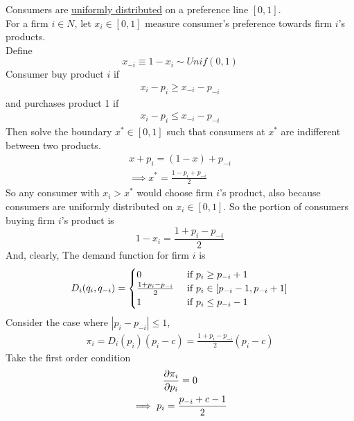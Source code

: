 \documentclass[11pt]{article}
\begin{document}
	\begin{example}
		Consumers are \ul{uniformly distributed} on a preference line $[0,1]$.\\
		For a firm $i \in N$, let $x_i \in [0,1]$ measure consumer's preference towards firm $i$'s products. \\
		Define 
		\begin{equation}
			x_{-i} \equiv 1 - x_i \sim Unif(0,1)
		\end{equation}
		Consumer buy product $i$ if 
		\begin{gather}
			x_i - p_i \geq x_{-i} - p_{-i}
		\end{gather}
		and purchases product 1 if
		\begin{gather}
			x_i - p_i \leq x_{-i} - p_{-i}
		\end{gather}
		Then solve the boundary $x^* \in [0, 1]$ such that consumers at $x^*$ are indifferent between  two products.
		\begin{gather}
			x + p_i = (1 - x) + p_{-i} \\
			\implies x^* = \frac{1 - p_i + p_{-i}}{2}
		\end{gather}
		So any consumer with $x_i > x^*$ would choose firm $i$'s product, also because consumers are uniformly distributed on $x_i \in [0,1]$. So the portion of consumers buying firm $i$'s product is
		\begin{equation}
			1 - x_i = \frac{1 + p_i - p_{-i}}{2}
		\end{equation}
		And, clearly, 
		The demand function for firm $i$ is
		\begin{gather}
			D_i(q_i, q_{-i}) = \begin{cases}
				0 &\text{{ if }} p_i \geq p_{-i} + 1 \\
				\frac{1 + p_i - p_{-i}}{2} &\text{{ if }} p_i \in [p_{-i}-1, p_{-i}+1]\\
				1 &\text{{ if }} p_i \leq p_{-i} - 1\\
			\end{cases}
		\end{gather}
		Consider the case where $|p_i - p_{-i}| \leq 1$, 
		\begin{gather}
			\pi_i = D_i(p_i) (p_i - c) = \frac{1 + p_i - p_{-i}}{2} (p_i - c)
		\end{gather}
		Take the first order condition
		\begin{gather}
			\frac{\partial{\pi_i}}{\partial{p_i}} = 0 \\
			\implies p_i = \frac{p_{-i} + c - 1}{2}
		\end{gather}
	\end{example}
	
\end{document}
